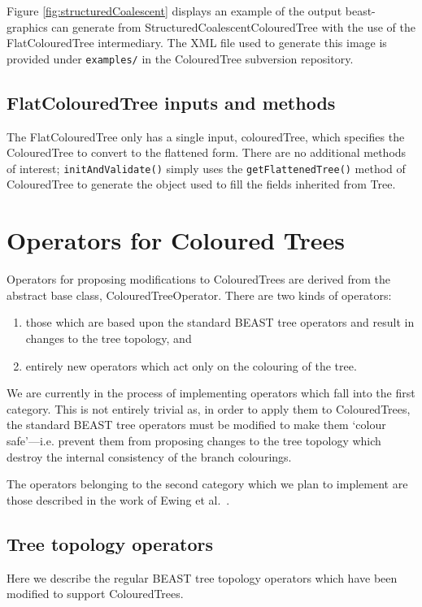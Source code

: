 \documentclass[a4paper,11pt]{paper}
\newcommand{\class}[1]{\textsf{#1}}
\newcommand{\project}[1]{\textsf{#1}}
\newcommand{\inp}[1]{\textsf{\color{blue}#1}}
\newcommand{\code}[1]{\texttt{#1}}
\begin{document}
Figure \ref{fig:structuredCoalescent} displays an example of the
output \project{beast-graphics} can generate from
\class{StructuredCoalescentColouredTree} with the use of the
\class{FlatColouredTree} intermediary. The XML file used to generate
this image is provided under \code{examples/} in the
\project{ColouredTree} subversion repository.

\subsection{FlatColouredTree inputs and methods}

The \class{FlatColouredTree} only has a single input,
\inp{colouredTree}, which specifies the \class{ColouredTree} to
convert to the flattened form. There are no additional methods of
interest; \code{initAndValidate()} simply uses the
\code{getFlattenedTree()} method of \class{ColouredTree} to generate
the object used to fill the fields inherited from \class{Tree}.

\section{Operators for Coloured Trees}

Operators for proposing modifications to \class{ColouredTree}s are
derived from the abstract base class, \class{ColouredTreeOperator}.
There are two kinds of operators:
\begin{enumerate}
	\item those which are based upon the standard BEAST tree
		operators and result in changes to the tree topology,
		and
	\item entirely new operators which act only on the colouring
		of the tree.
\end{enumerate}

We are currently in the process of implementing operators which fall
into the first category.  This is not entirely trivial as, in order to
apply them to ColouredTrees, the standard BEAST tree operators must be
modified to make them `colour safe'---i.e. prevent them from proposing
changes to the tree topology which destroy the internal consistency of
the branch colourings.

The operators belonging to the second category which we plan to
implement are those described in the work of Ewing et al.~\cite{Ewing2004}.

\subsection{Tree topology operators}
Here we describe the regular BEAST tree topology operators which have been
modified to support \class{ColouredTree}s.
\end{document}
